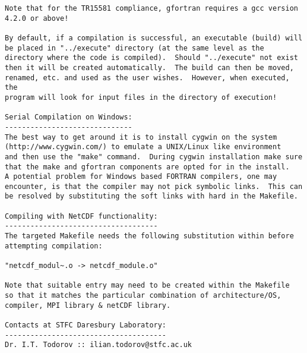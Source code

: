 \begin{verbatim}
Note that for the TR15581 compliance, gfortran requires a gcc version
4.2.0 or above!

By default, if a compilation is successful, an executable (build) will
be placed in "../execute" directory (at the same level as the
directory where the code is compiled).  Should "../execute" not exist
then it will be created automatically.  The build can then be moved,
renamed, etc. and used as the user wishes.  However, when executed, the
program will look for input files in the directory of execution!

Serial Compilation on Windows:
------------------------------
The best way to get around it is to install cygwin on the system
(http://www.cygwin.com/) to emulate a UNIX/Linux like environment
and then use the "make" command.  During cygwin installation make sure
that the make and gfortran components are opted for in the install.
A potential problem for Windows based FORTRAN compilers, one may
encounter, is that the compiler may not pick symbolic links.  This can
be resolved by substituting the soft links with hard in the Makefile.

Compiling with NetCDF functionality:
------------------------------------
The targeted Makefile needs the following substitution within before
attempting compilation:

"netcdf_modul~.o -> netcdf_module.o"

Note that suitable entry may need to be created within the Makefile
so that it matches the particular combination of architecture/OS,
compiler, MPI library & netCDF library.

Contacts at STFC Daresbury Laboratory:
--------------------------------------
Dr. I.T. Todorov :: ilian.todorov@stfc.ac.uk
\end{verbatim}
